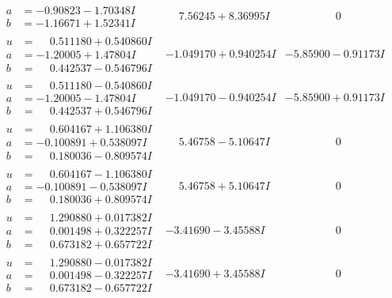 \documentclass[1p]{elsarticle_modified}
\theoremstyle{definition}
\begin{document}
$$\begin{array}{c|c|c}
\begin{aligned}
a &= -0.90823 - 1.70348 I \\
b &= -1.16671 + 1.52341 I\end{aligned}
 & \phantom{-}7.56245 + 8.36995 I & \phantom{-0.000000 } 0 \\ \hline\begin{aligned}
u &= \phantom{-}0.511180 + 0.540860 I \\
a &= -1.20005 + 1.47804 I \\
b &= \phantom{-}0.442537 - 0.546796 I\end{aligned}
 & -1.049170 + 0.940254 I & -5.85900 - 0.91173 I \\ \hline\begin{aligned}
u &= \phantom{-}0.511180 - 0.540860 I \\
a &= -1.20005 - 1.47804 I \\
b &= \phantom{-}0.442537 + 0.546796 I\end{aligned}
 & -1.049170 - 0.940254 I & -5.85900 + 0.91173 I \\ \hline\begin{aligned}
u &= \phantom{-}0.604167 + 1.106380 I \\
a &= -0.100891 + 0.538097 I \\
b &= \phantom{-}0.180036 - 0.809574 I\end{aligned}
 & \phantom{-}5.46758 - 5.10647 I & \phantom{-0.000000 } 0 \\ \hline\begin{aligned}
u &= \phantom{-}0.604167 - 1.106380 I \\
a &= -0.100891 - 0.538097 I \\
b &= \phantom{-}0.180036 + 0.809574 I\end{aligned}
 & \phantom{-}5.46758 + 5.10647 I & \phantom{-0.000000 } 0 \\ \hline\begin{aligned}
u &= \phantom{-}1.290880 + 0.017382 I \\
a &= \phantom{-}0.001498 + 0.322257 I \\
b &= \phantom{-}0.673182 + 0.657722 I\end{aligned}
 & -3.41690 - 3.45588 I & \phantom{-0.000000 } 0 \\ \hline\begin{aligned}
u &= \phantom{-}1.290880 - 0.017382 I \\
a &= \phantom{-}0.001498 - 0.322257 I \\
b &= \phantom{-}0.673182 - 0.657722 I\end{aligned}
 & -3.41690 + 3.45588 I & \phantom{-0.000000 } 0 \\ \hline\begin{aligned}

\end{aligned}
\end{array}$$
\end{document}
